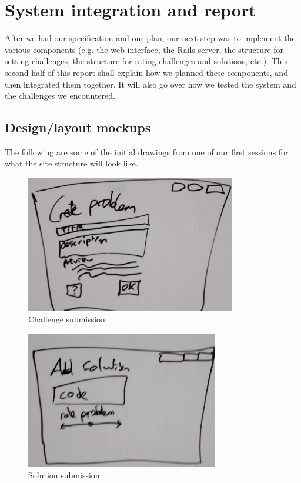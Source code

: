 \documentclass{report}
\begin{document}
\chapter{System integration and report}
After we had our specification and our plan, our next step was to implement the various components (e.g. the web interface, the Rails server, the structure for setting challenges, the structure for rating challenges and solutions, etc.). This second half of this report shall explain how we planned these components, and then integrated them together. It will also go over how we tested the system and the challenges we encountered.

\section{Design/layout mockups}
The following are some of the initial drawings from one of our first sessions for what the site structure will look like.

\begin{figure}[H]
\centerline{\includegraphics[height=6cm]{newProblemMockup}}
\caption{Challenge submission}
\end{figure}

\begin{figure}[H]
\centerline{\includegraphics[height=6cm]{newSolutionMockup}}
\caption{Solution submission}
\end{figure}
\end{document}
